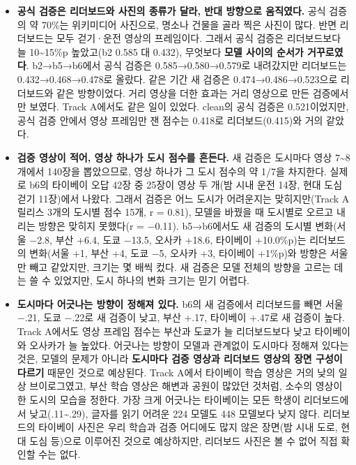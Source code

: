 \documentclass[11pt]{article}
\begin{document}
\begin{itemize}
\item \textbf{공식 검증은 리더보드와 사진의 종류가 달라, 반대 방향으로 움직였다.} 공식 검증의 약 70\%는 위키미디어 사진으로, 명소나 건물을 골라 찍은 사진이 많다. 반면 리더보드는 모두 걷기·운전 영상의 프레임이다. 그래서 공식 검증은 리더보드보다 늘 10\textasciitilde 15\%p 높았고(b2 0.585 대 0.432), 무엇보다 \textbf{모델 사이의 순서가 거꾸로였다}. b2→b5→b6에서 공식 검증은 0.585→0.580→0.579로 내려갔지만 리더보드는 0.432→0.468→0.478로 올랐다. 같은 기간 새 검증은 0.474→0.486→0.523으로 리더보드와 같은 방향이었다. 거리 영상을 더한 효과는 거리 영상으로 만든 검증에서만 보였다. Track A에서도 같은 일이 있었다. clean의 공식 검증은 0.521이었지만, 공식 검증 안에서 영상 프레임만 잰 점수는 0.418로 리더보드(0.415)와 거의 같았다.
\item \textbf{검증 영상이 적어, 영상 하나가 도시 점수를 흔든다.} 새 검증은 도시마다 영상 7\textasciitilde 8개에서 140장을 뽑았으므로, 영상 하나가 그 도시 점수의 약 1/7을 차지한다. 실제로 b6의 타이베이 오답 42장 중 25장이 영상 두 개(밤 시내 운전 14장, 현대 도심 걷기 11장)에서 나왔다. 그래서 검증은 어느 도시가 어려운지는 맞히지만(Track A 릴리스 3개의 도시별 점수 15개, r = 0.81), 모델을 바꿨을 때 도시별로 오르고 내리는 방향은 맞히지 못했다(r = −0.11). b5→b6에서도 새 검증의 도시별 변화(서울 −2.8, 부산 +6.4, 도쿄 −13.5, 오사카 +18.6, 타이베이 +10.0\%p)는 리더보드의 변화(서울 +1, 부산 +4, 도쿄 −5, 오사카 +3, 타이베이 +1\%p)와 방향은 서울만 빼고 같았지만, 크기는 몇 배씩 컸다. 새 검증은 모델 전체의 방향을 고르는 데는 쓸 수 있었지만, 도시 하나의 변화 크기는 믿기 어렵다.
\item \textbf{도시마다 어긋나는 방향이 정해져 있다.} b6의 새 검증에서 리더보드를 빼면 서울 −.21, 도쿄 −.22로 새 검증이 낮고, 부산 +.17, 타이베이 +.47로 새 검증이 높다. Track A에서도 영상 프레임 점수는 부산과 도쿄가 늘 리더보드보다 낮고 타이베이와 오사카가 늘 높았다. 어긋나는 방향이 모델과 관계없이 도시마다 정해져 있다는 것은, 모델의 문제가 아니라 \textbf{도시마다 검증 영상과 리더보드 영상의 장면 구성이 다르기} 때문인 것으로 예상된다. Track A에서 타이베이 학습 영상은 거의 낮의 일상 브이로그였고, 부산 학습 영상은 해변과 공원이 많았던 것처럼, 소수의 영상이 한 도시의 모습을 정한다. 가장 크게 어긋나는 타이베이는 모든 학생이 리더보드에서 낮고(.11\textasciitilde .29), 글자를 읽기 어려운 224 모델도 448 모델보다 낮지 않다. 리더보드의 타이베이 사진은 우리 학습과 검증 어디에도 많지 않은 장면(밤 시내 도로, 현대 도심 등)으로 이루어진 것으로 예상하지만, 리더보드 사진은 볼 수 없어 직접 확인할 수는 없다.
\end{itemize}
\end{document}
